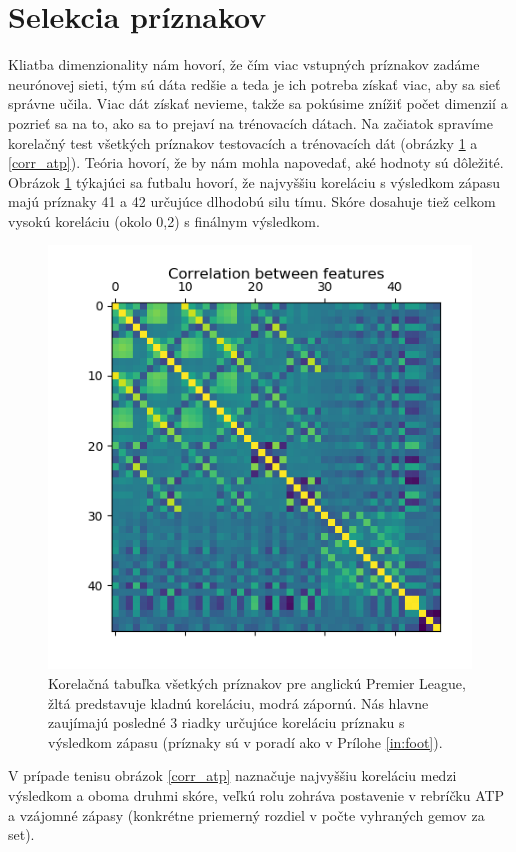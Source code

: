 \section{Selekcia príznakov}
Kliatba dimenzionality nám hovorí, že čím viac vstupných príznakov zadáme neurónovej sieti, tým sú dáta redšie a teda je ich potreba získať viac, aby sa sieť správne učila. Viac dát získať nevieme, takže sa pokúsime znížiť počet dimenzií a pozrieť sa na to, ako sa to prejaví na trénovacích dátach.
Na začiatok spravíme korelačný test všetkých príznakov testovacích a trénovacích dát (obrázky \ref{corr} a \ref{corr_atp}).
Teória hovorí, že by nám mohla napovedať, aké hodnoty sú dôležité.
Obrázok \ref{corr} týkajúci sa futbalu hovorí, že najvyššiu koreláciu s výsledkom zápasu majú príznaky 41 a 42 určujúce dlhodobú silu tímu. Skóre dosahuje tiež celkom vysokú koreláciu (okolo 0,2) s finálnym výsledkom.
\noindent
\begin{figure}  [h!]
\includegraphics[scale=0.9]{../img/correng.png}
\caption{Korelačná tabuľka všetkých príznakov pre anglickú Premier League, žltá predstavuje kladnú koreláciu, modrá zápornú. Nás hlavne zaujímajú posledné 3 riadky určujúce koreláciu príznaku s výsledkom zápasu (príznaky sú v poradí ako v Prílohe \ref{in:foot}).}
\label{corr} 
\end{figure}

V prípade tenisu obrázok \ref{corr_atp} naznačuje najvyššiu koreláciu medzi výsledkom a oboma druhmi skóre, veľkú rolu zohráva postavenie v rebríčku ATP a vzájomné zápasy (konkrétne priemerný rozdiel v počte vyhraných gemov za set).

